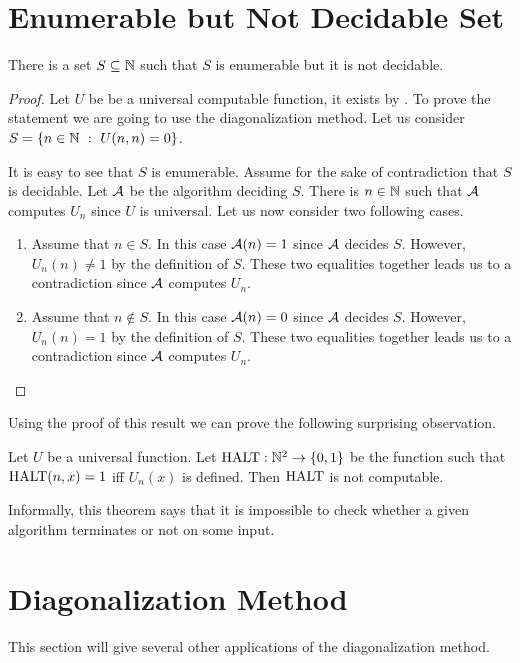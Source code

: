\section{Enumerable but Not Decidable Set}
\begin{theorem}
\label{theorem:enumerable-not-decidable}
  There is a set $S \subseteq {\mathbb{N}}$ such that $S$ is enumerable but it is not
  decidable.
\end{theorem}
\begin{proof}
  Let $U$ be be a universal computable function, it exists by
  .
  To prove the statement we are going to use the diagonalization method.
  Let us consider $S = \set[U(n, n) = 0]{n \in \N}$.

  It is easy to see that $S$ is enumerable. Assume for the sake of
  contradiction that $S$ is decidable. Let $\mathcal{A}$ be the algorithm
  deciding $S$. There is $n \in {\mathbb{N}}$ such that $\mathcal{A}$ computes $U_n$
  since $U$ is universal. Let us now consider two following cases.
  \begin{enumerate}
    \item Assume that $n \in S$. In this case $\mathcal{A}(n) = 1$ since
      $\mathcal{A}$ decides $S$. However, $U_n(n) \neq 1$ by the definition of
      $S$. These two equalities together leads us to a contradiction since
      $\mathcal{A}$ computes $U_n$.
    \item Assume that $n \notin S$. In this case $\mathcal{A}(n) = 0$ since
      $\mathcal{A}$ decides $S$. However, $U_n(n) = 1$ by the definition of
      $S$. These two equalities together leads us to a contradiction since
      $\mathcal{A}$ computes $U_n$.
  \end{enumerate}
\end{proof}

Using the proof of this result we can prove the following surprising
observation.
\begin{theorem}
  Let $U$ be a universal function.
  Let $\Halting : \N^2 \to \set{0, 1}$ be the function such that
  $\mathrm{HALT}(n, x) = 1$ iff $U_n(x)$ is defined. Then $\mathrm{HALT}$ is not
  computable.
\end{theorem}
Informally, this theorem says that it is impossible to check whether a given
algorithm terminates or not on some input.


\section{Diagonalization Method}
This section will give several other applications of the diagonalization method.

